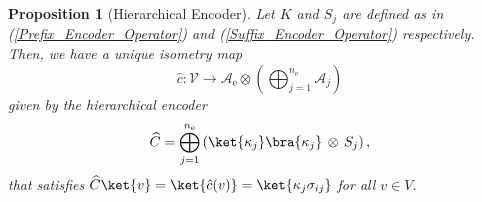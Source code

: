 \documentclass[conference]{IEEEtran}
\newtheorem{proposition}{Proposition}
\begin{document}
\begin{proposition}[Hierarchical Encoder]\label{proposition encoder}
Let ${K}$ and ${S}_j$ are defined as in (\ref{Prefix_Encoder_Operator}) and (\ref{Suffix_Encoder_Operator}) respectively.
Then, we have a unique isometry map
\[ \hat{c} : \mathcal{V} \to \mathcal{A}_{\mathrm{e}} \otimes\left( \bigoplus_{j=1}^{n_{\mathrm{e}}} \mathcal{A}_j\right)\] 
given by the hierarchical encoder
\[
    \widehat{C} = \bigoplus_{j=1}^{n_\mathrm{e}} \left(\ket{\kappa_j}\bra{\kappa_j}   \,\otimes\, {S}_j\right),
\]
that satisfies
$\widehat{C}\ket{v} = \ket{\hat{c}(v)}=\ket{\kappa_j \sigma_{ij}}$ for all $v \in V$.
\end{proposition}
\end{document}
